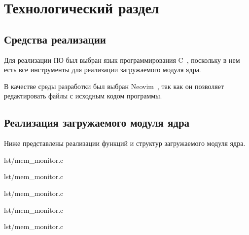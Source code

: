 \section{Технологический раздел}

\subsection{Средства реализации}

Для реализации ПО был выбран язык программирования C~\cite{c}, поскольку в нем есть все инструменты для реализации загружаемого модуля ядра.

В качестве среды разработки был выбран Neovim~\cite{neovim}, так как он позволяет редактировать файлы с исходным кодом программы.

\subsection{Реализация загружаемого модуля ядра}

Ниже представлены реализации функций и структур загружаемого модуля ядра.

\begin{lstinputlisting}[
        label={lst:},
        caption={Структура struct mem\_alloc\_entry для логирования информации},
        firstline=23,
        lastline=31,
    ]{lst/mem_monitor.c}
\end{lstinputlisting}

\begin{lstinputlisting}[
        label={lst:},
        caption={Функция pre\_kmalloc\_handler},
        firstline=48,
        lastline=74,
    ]{lst/mem_monitor.c}
\end{lstinputlisting}

\begin{lstinputlisting}[
        label={lst:},
        caption={Функция pre\_kmem\_cache\_alloc\_handler},
        firstline=160,
        lastline=202,
    ]{lst/mem_monitor.c}
\end{lstinputlisting}

\begin{lstinputlisting}[
        label={lst:},
        caption={Проба kp\_kmalloc},
        firstline=204,
        lastline=207,
    ]{lst/mem_monitor.c}
\end{lstinputlisting}

\begin{lstinputlisting}[
        label={lst:},
        caption={Проба kp\_kmalloc},
        firstline=224,
        lastline=227,
    ]{lst/mem_monitor.c}
\end{lstinputlisting}

